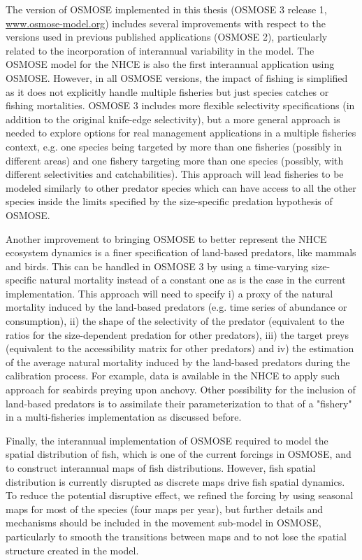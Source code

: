 The version of OSMOSE implemented in this thesis (OSMOSE 3 release 1, \url{www.osmose-model.org}) includes several improvements with respect to the versions used in previous published applications (OSMOSE 2), particularly related to the incorporation of interannual variability in the model. The OSMOSE model for the NHCE is also the first interannual application using OSMOSE. However, in all OSMOSE versions, the impact of fishing is simplified as it does not explicitly handle multiple fisheries but just species catches or fishing mortalities. OSMOSE 3 includes more flexible selectivity specifications (in addition to the original knife-edge selectivity), but a more general approach is needed to explore options for real management applications in a multiple fisheries context, e.g. one species being targeted by more than one fisheries (possibly in different areas) and one fishery targeting more than one species (possibly, with different selectivities and catchabilities). This approach will lead fisheries to be modeled similarly to other predator species which can have access to all the other species inside the limits specified by the size-specific predation hypothesis of OSMOSE.


Another improvement to bringing OSMOSE to better represent the NHCE ecosystem dynamics is a finer specification of land-based predators, like mammals and birds. This can be handled in OSMOSE 3 by using a time-varying size-specific natural mortality instead of a constant one as is the case in the current implementation. This approach will need to specify i) a proxy of the natural mortality induced by the land-based predators (e.g. time series of abundance or consumption), ii) the shape of the selectivity of the predator (equivalent to the ratios for the size-dependent predation for other predators), iii) the target preys (equivalent to the accessibility matrix for other predators) and iv) the estimation of the average natural mortality induced by the land-based predators during the calibration process. For example, data is available in the NHCE to apply such approach for seabirds preying upon anchovy. Other possibility for the inclusion of land-based predators is to assimilate their parameterization to that of a "fishery" in a multi-fisheries implementation as discussed before.


Finally, the interannual implementation of OSMOSE required to model the spatial distribution of fish, which is one of the current forcings in OSMOSE, and to construct interannual maps of fish distributions. However, fish spatial distribution is currently disrupted as discrete maps drive fish spatial dynamics. To reduce the potential disruptive effect, we refined the forcing by using seasonal maps for most of the species (four maps per year), but further details and mechanisms should be included in the movement sub-model in OSMOSE, particularly to smooth the transitions between maps and to not lose the spatial structure created in the model.


